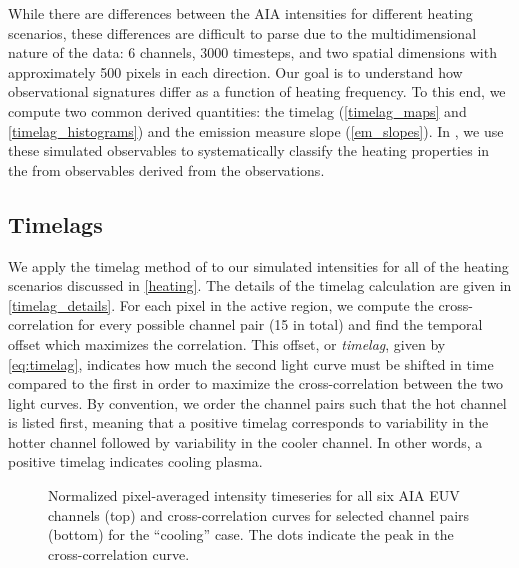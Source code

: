 While there are differences between the AIA intensities for different heating scenarios, these differences are difficult to parse due to the multidimensional nature of the data: 6 channels, 3000 timesteps, and two spatial dimensions with approximately 500 pixels in each direction. Our goal is to understand how observational signatures differ as a function of heating frequency. To this end, we compute two common derived quantities: the timelag (\autoref{timelag_maps} and \autoref{timelag_histograms}) and the emission measure slope (\autoref{em_slopes}). In , we use these simulated observables to systematically classify the heating properties in the \AR{} from observables derived from the observations.

\subsection{Timelags}\label{timelags}

We apply the timelag method of \citet{viall_evidence_2012} to our simulated intensities for all of the heating scenarios discussed in \autoref{heating}. The details of the timelag calculation are given in \autoref{timelag_details}. For each pixel in the active region, we compute the cross-correlation for every possible channel pair (15 in total) and find the temporal offset which maximizes the correlation. This offset, or \textit{timelag}, given by \autoref{eq:timelag}, indicates how much the second light curve must be shifted in time compared to the first in order to maximize the cross-correlation between the two light curves. By convention, we order the channel pairs such that the hot channel is listed first, meaning that a positive timelag corresponds to variability in the hotter channel followed by variability in the cooler channel. In other words, a positive timelag indicates cooling plasma.

\begin{figure}
    \caption{Normalized pixel-averaged intensity timeseries for all six AIA EUV channels (top) and cross-correlation curves for selected channel pairs (bottom) for the ``cooling'' case. The dots indicate the peak in the cross-correlation curve.}
    \label{fig:correlation_1d}
\end{figure}

